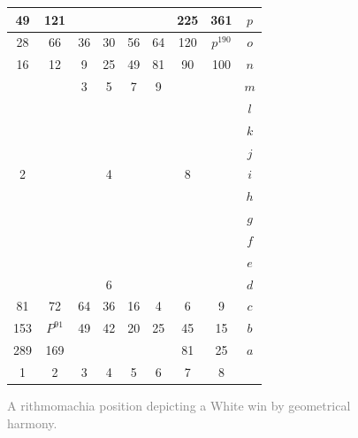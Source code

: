 \documentclass[14pt]{extarticle}
\begin{document}
\begin{figure}[H] 
\centering 
{\small{
\begin{tabular}{|c|c|c|c|c|c|c|c||c} \hline
\squadfill{\,}49 & \squadfill{\,}121 & \quad  & \quad  & \quad  & \quad  & \squadfill{\,}225 & \squadfill{\,}361 & $p$ \\ \hline
\squadfill{\,}28 & \squadfill{\,}66 & \trianglepafill{\,}36 & \trianglepafill{\,}30 & \trianglepafill{\,}56 & \trianglepafill{\,}64 & \squadfill{\,}120 & \rhombusfill{\,}$p^{190}$ & $o$ \\ \hline
\trianglepafill{\,}16 & \trianglepafill{\,}12 & \circletfill{\,}9 & \circletfill{\,}25 & \circletfill{\,}49 & \circletfill{\,}81 & \trianglepafill{\,}90 & \trianglepafill{\,}100 & $n$ \\ \hline
\quad  & \quad  & \circletfill{\,}3 & \circletfill{\,}5 & \circletfill{\,}7 & \circletfill{\,}9 & \quad  & \quad  & $m$ \\ \hline
\quad  & \quad  & \quad  & \quad  & \quad  & \quad  & \quad  & \quad  & $l$ \\ \hline
\quad  & \quad  & \quad  & \quad  & \quad  & \quad  & \quad  & \quad  & $k$ \\ \hline
\quad  & \quad  & \quad  & \quad  & \quad  & \quad  & \quad  & \quad  & $j$ \\ \hline
\circlet{\,}2 & \quad  & \quad  & \circlet{\,}4 & \quad  & \quad  & \circlet{\,}8 & \quad  & $i$ \\ \hline
\quad  & \quad  & \quad  & \quad  & \quad  & \quad  & \quad  & \quad  & $h$ \\ \hline
\quad  & \quad  & \quad  & \quad  & \quad  & \quad  & \quad  & \quad  & $g$ \\ \hline
\quad  & \quad  & \quad  & \quad  & \quad  & \quad  & \quad  & \quad  & $f$ \\ \hline
\quad  & \quad  & \quad  & \quad  & \quad  & \quad  & \quad  & \quad  & $e$ \\ \hline
\quad  & \quad  & \quad  & \circlet{\,}6 & \quad  & \quad  & \quad  & \quad  & $d$ \\ \hline
\trianglepa{\,}81 & \trianglepa{\,}72 & \circlet{\,}64 & \circlet{\,}36 & \circlet{\,}16 & \circlet{\,}4 & \trianglepa{\,}6 & \trianglepa{\,}9 & $c$ \\ \hline
\squad{\,}153 & \rhombus{\,}$P^{91}$ & \trianglepa{\,}49 & \trianglepa{\,}42 & \trianglepa{\,}20 & \trianglepa{\,}25 & \squad{\,}45 & \squad{\,}15 & $b$ \\ \hline
\squad{\,}289 & \squad{\,}169 & \quad  & \quad  & \quad  & \quad  & \squad{\,}81 & \squad{\,}25 & $a$ \\ \hline
1 &  2 &  3 &  4 &  5 &  6 &  7 &  8  &  \\
\end{tabular}
}}
\caption{\textcolor{gray}{A rithmomachia position depicting a White win by geometrical harmony.}}
\label{fig:rithmomachia-white-win-geometrical-harmony2} 
\end{figure}
\end{document}
